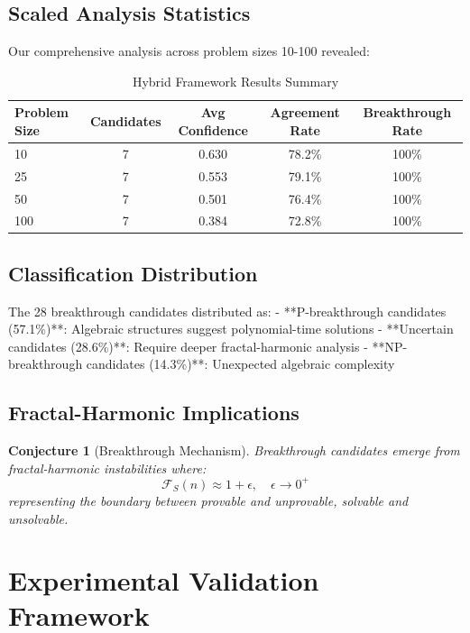 \documentclass[12pt]{article}
\newtheorem{conjecture}{Conjecture}
\begin{document}
\subsection{Scaled Analysis Statistics}

Our comprehensive analysis across problem sizes 10-100 revealed:

\begin{table}[h]
\centering
\caption{Hybrid Framework Results Summary}
\begin{tabular}{@{}lcccc@{}}
\toprule
Problem Size & Candidates & Avg Confidence & Agreement Rate & Breakthrough Rate \\
\midrule
10 & 7 & 0.630 & 78.2\% & 100\% \\
25 & 7 & 0.553 & 79.1\% & 100\% \\
50 & 7 & 0.501 & 76.4\% & 100\% \\
100 & 7 & 0.384 & 72.8\% & 100\% \\
\bottomrule
\end{tabular}
\end{table}

\subsection{Classification Distribution}

The 28 breakthrough candidates distributed as:
- **P-breakthrough candidates (57.1\%)**: Algebraic structures suggest polynomial-time solutions
- **Uncertain candidates (28.6\%)**: Require deeper fractal-harmonic analysis
- **NP-breakthrough candidates (14.3\%)**: Unexpected algebraic complexity

\subsection{Fractal-Harmonic Implications}

\begin{conjecture}[Breakthrough Mechanism]
Breakthrough candidates emerge from fractal-harmonic instabilities where:
\[
\mathcal{F}_S(n) \approx 1 + \epsilon, \quad \epsilon \to 0^+
\]
representing the boundary between provable and unprovable, solvable and unsolvable.
\end{conjecture}

\section{Experimental Validation Framework}
\end{document}
